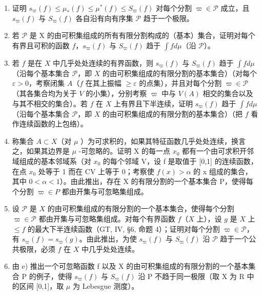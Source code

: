 \begin{enumerate}
\def\labelenumi{\alph{enumi})}
\item
  证明 \(s_{\varpi}(f) \leqslant \mu_{*}(f) \leqslant \mu^{*}(f) \leqslant S_{\varpi}(f)\) 对每个分割 \(\varpi \in \mathcal{P}\) 成立，且 \(s_{\varpi}(f)\) 与 \(S_{\varpi}(f)\) 各自沿有向有序集 \(\mathcal{P}\) 趋于一个极限。
\item
  若 \(\mathcal{P}\) 是 X 的由可积集组成的所有有限分割构成的（基本）集合，证明对每个有界且可积的函数 \(f\)，\(s_{\varpi}(f)\) 与 \(S_{\varpi}(f)\) 趋于 \(\int f d\mu\)（沿 \(\mathcal{P}\)）。
\item
  若 \(f\) 是在 \(X\) 中几乎处处连续的有界函数，则 \(s_{\varpi}(f)\) 与 \(S_{\varpi}(f)\) 趋于 \(\int f d\mu\)（沿每个基本集合 \(\mathcal{P}\)，即 \(X\) 的由可积集组成的有限分割的基本集合）（对每个 \(\varepsilon > 0\)，考察闭集 \(A\)（\(f\) 在其上振幅 \(\geqslant \varepsilon\) 的点集），并且对每个分割 \(\varpi \in \mathcal{P}\)（其各集合均为关于 \(V\) 的小集），分别考察 \(\varpi\) 中与 \(V(A)\) 相交的集合以及与其不相交的集合）。若 \(f\) 在 \(X\) 上有界且下半连续，证明 \(s_{\varpi}(f)\) 趋于 \(\int f d\mu\)（沿每个基本集合 \(\mathcal{P}\)，即 \(X\) 的由可积集组成的有限分割的基本集合）（把 \(f\) 看作连续函数的上包络）。
\item
  称集合 \(A \subset X\)（对 \(\mu\) ）为可求积的，如果其特征函数几乎处处连续，换言之，如果其边界是 \(\mu\) -可忽略的。证明 X 的每一点 \(x_{0}\) 都有一个由可求积开邻域组成的基本邻域系（对 \(x_{0}\) 的每个邻域 V，设 f 是取值于 {[}0,1{]} 的连续函数，在点 \(x_{0}\) 处等于 1 而在 CV 上等于 0；考察使 \(f(x) > \alpha\) 的 x 组成的集合，其中 \(0 < \alpha < 1\)）。由此推出，存在 X 的有限分割的一个基本集合 P，使得每个分割 \(\varpi \in P\) 都由开集与可忽略集组成。
\item
  设 \(\mathcal{P}\) 是 \(X\) 的由可积集组成的有限分割的一个基本集合，使得每个分割 \(\varpi \in \mathcal{P}\) 都由开集与可忽略集组成。对每个有界函数 \(f\)（\(X\) 上），设 \(g\) 是 \(X\) 上 \(\leqslant f\) 的最大下半连续函数（GT, IV, §6, 命题 4）；证明对每个分割 \(\varpi \in \mathcal{P}\)，有 \(s_{\varpi}(f) = s_{\varpi}(g)\)。由此推出，为使 \(s_{\varpi}(f)\) 与 \(S_{\varpi}(f)\) 沿 \(\mathcal{P}\) 趋于一个公共极限，必须 \(f\) 在 \(X\) 中几乎处处连续。
\item
  由 e) 推出一个可忽略函数 f 以及 X 的由可积集组成的有限分割的一个基本集合 P 的例子，使得 \(s_{\varpi}(f)\) 与 \(S_{\varpi}(f)\) 沿 P 不趋于同一极限（取 X 为 R 中的区间 {[}0,1{]}，取 \(\mu\) 为 Lebesgue 测度）。
\end{enumerate}

